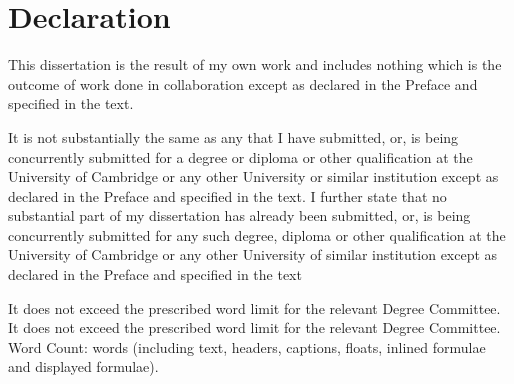 \chapter*{Declaration}


This dissertation is the result of my own work and includes nothing which is the outcome of work done in collaboration except as declared in the Preface and specified in the text.

It is not substantially the same as any that I have submitted, or, is being concurrently submitted for a degree or diploma or other qualification at the University of Cambridge or any other University or similar institution except as declared in the Preface and specified in the text. I further state that no substantial part of my dissertation has already been submitted, or, is being concurrently submitted for any such degree, diploma or other qualification at the University of Cambridge or any other University of similar institution except as declared in the Preface and specified in the text


\ifdefined\lightweight{}
It does not exceed the prescribed word limit for the relevant Degree Committee.  
\else
It does not exceed the prescribed word limit for the relevant Degree Committee. Word Count: \wordcount{}words (including text, headers, captions, floats, inlined formulae and displayed formulae).
\fi


\cleardoublepage{}
